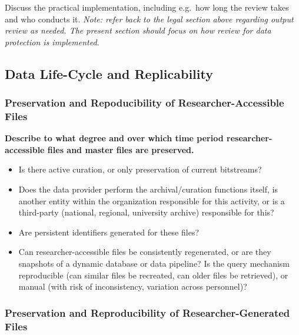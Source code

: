 \documentclass[
]{book}
\providecommand{\tightlist}{%
  \setlength{\itemsep}{0pt}\setlength{\parskip}{0pt}}
\begin{document}
Discuss the practical implementation, including e.g.~how long the review takes and who conducts it. \emph{Note: refer back to the legal section above regarding output review as needed. The present section should focus on how review for data protection is implemented.}

\hypertarget{data-life-cycle-and-replicability-6}{%
\subsection*{Data Life-Cycle and Replicability}\label{data-life-cycle-and-replicability-6}}

\hypertarget{preservation-and-repoducibility-of-researcher-accessible-files}{%
\subsubsection*{Preservation and Repoducibility of Researcher-Accessible Files}\label{preservation-and-repoducibility-of-researcher-accessible-files}}

\textbf{Describe to what degree and over which time period researcher-accessible files and master files are preserved.}

\begin{itemize}
\tightlist
\item
  Is there active curation, or only preservation of current bitstreams?
\item
  Does the data provider perform the archival/curation functions itself, is another entity within the organization responsible for this activity, or is a third-party (national, regional, university archive) responsible for this?
\item
  Are persistent identifiers generated for these files?
\item
  Can researcher-accessible files be consistently regenerated, or are they snapshots of a dynamic database or data pipeline? Is the query mechanism reproducible (can similar files be recreated, can older files be retrieved), or manual (with risk of inconsistency, variation across personnel)?
\end{itemize}

\hypertarget{preservation-and-reproducibility-of-researcher-generated-files-6}{%
\subsubsection*{Preservation and Reproducibility of Researcher-Generated Files}\label{preservation-and-reproducibility-of-researcher-generated-files-6}}
\end{document}
